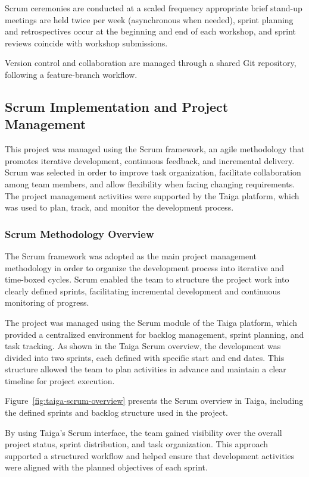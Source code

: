 \documentclass[12pt,a4paper]{article}
\begin{document}
Scrum ceremonies are conducted at a scaled frequency appropriate brief stand-up meetings are held twice per week (asynchronous when needed), sprint planning and retrospectives occur at the beginning and end of each workshop, and sprint reviews coincide with workshop submissions.\newline

Version control and collaboration are managed through a shared Git repository, following a feature-branch workflow. 


\subsection{Scrum Implementation and Project Management} 
This project was managed using the Scrum framework, an agile methodology that promotes iterative development, continuous feedback, and incremental delivery. Scrum was selected in order to improve task organization, facilitate collaboration among team members, and allow flexibility when facing changing requirements. The project management activities were supported by the Taiga platform, which was used to plan, track, and monitor the development process.
\subsubsection{Scrum Methodology Overview}

The Scrum framework was adopted as the main project management methodology in order to organize the development process into iterative and time-boxed cycles. Scrum enabled the team to structure the project work into clearly defined sprints, facilitating incremental development and continuous monitoring of progress.

The project was managed using the Scrum module of the Taiga platform, which provided a centralized environment for backlog management, sprint planning, and task tracking. As shown in the Taiga Scrum overview, the development was divided into two sprints, each defined with specific start and end dates. This structure allowed the team to plan activities in advance and maintain a clear timeline for project execution.

Figure~\ref{fig:taiga-scrum-overview} presents the Scrum overview in Taiga, including the defined sprints and backlog structure used in the project.

By using Taiga’s Scrum interface, the team gained visibility over the overall project status, sprint distribution, and task organization. This approach supported a structured workflow and helped ensure that development activities were aligned with the planned objectives of each sprint.
\end{document}

